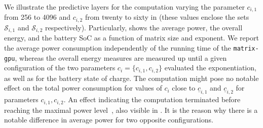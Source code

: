We illustrate the predictive layers for the computation varying the parameter $c_{i,1}$ from 256 to 4096 and $c_{i,2}$ from twenty to sixty in  (these values enclose the sets $\mathcal{S}_{i,1}$ and $\mathcal{S}_{i,2}$ respectively). Particularly,  shows the average power,  the overall energy, and  the battery SoC as a function of matrix size and exponent. We report the average power consumption independently of the running time of the {\small\tt matrix-gpu}, whereas the overall energy measures are measured up until a given configuration of the two parameters $c_{i}=\{c_{i,1},c_{i,2}\}$ evaluated the exponentiation, as well as for the battery state of charge. The computation might pose no notable effect on the total power consumption for values of $c_{i}$ close to $\underline{c}_{i,1}$ and $\underline{c}_{i,2}$ for parameters $c_{i,1},c_{i,2}$. An effect indicating the computation terminated before reaching the maximal power level~\citep{seewald2019coarse}, also visible in . It is the reason why there is a notable difference in average power for two opposite configurations.

